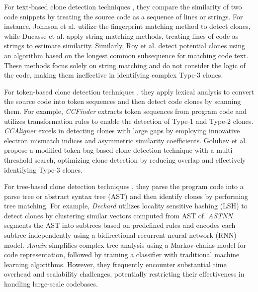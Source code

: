 For text-based clone detection techniques \cite{johnson1994substring, ducasse1999language, roy2008nicad, ragkh2017using, kim2018software, jadon2016code, yu2017detecting, kim2017vuddy}, they compare the similarity of two code snippets by treating the source code as a sequence of lines or strings. 
For instance, Johnson et al. \cite{johnson1994substring} utilize the fingerprint matching method to detect clones, while Ducasse et al. \cite{ducasse1999language} apply string matching methods, treating lines of code as strings to estimate similarity. 
Similarly, Roy et al. \cite{roy2008nicad} detect potential clones using an algorithm based on the longest common subsequence for matching code text. 
These methods focus solely on string matching and do not consider the logic of the code, making them ineffective in identifying complex Type-3 clones.

For token-based clone detection techniques \cite{gode2009incremental, kamiya2002ccfinder, sajnani2016sourcerercc, li2017cclearner, wang2018ccaligner, golubev2021multi, hung2020cppcd}, they apply lexical analysis to convert the source code into token sequences and then detect code clones by scanning them. 
For example, \emph{CCFinder} \cite{kamiya2002ccfinder} extracts token sequences from program code and utilizes transformation rules to enable the detection of Type-1 and Type-2 clones. 
\emph{CCAligner} \cite{wang2018ccaligner} excels in detecting clones with large gaps by employing innovative electron mismatch indices and asymmetric similarity coefficients. 
Golubev et al. \cite{golubev2021multi} propose a modified token bag-based clone detection technique with a multi-threshold search, optimizing clone detection by reducing overlap and effectively identifying Type-3 clones. 

For tree-based clone detection techniques \cite{jiang2007deckard, wei2017cdlh, zhang2019astnn, liang2021astpath, jo2021twopass, pati2017comparison, chodarev2015haskell, hu2022treecen, wu2022amain}, they parse the program code into a parse tree or abstract syntax tree (AST) and then identify clones by performing tree matching. 
For example, \emph{Deckard} \cite{jiang2007deckard} utilizes locality sensitive hashing (LSH) to detect clones by clustering similar vectors computed from AST of. 
\emph{ASTNN} \cite{zhang2019astnn} segments the AST into subtrees based on predefined rules and encodes each subtree independently using a bidirectional recurrent neural network (RNN) model.
\emph{Amain} \cite{wu2022amain} simplifies complex tree analysis using a Markov chains model for code representation, followed by training a classifier with traditional machine learning algorithms.
However, they frequently encounter substantial time overhead and scalability challenges, potentially restricting their effectiveness in handling large-scale codebases.

